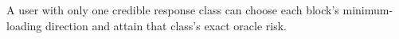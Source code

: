 A user with only one credible response class can choose each block's minimum-loading direction and attain that class's exact oracle risk.